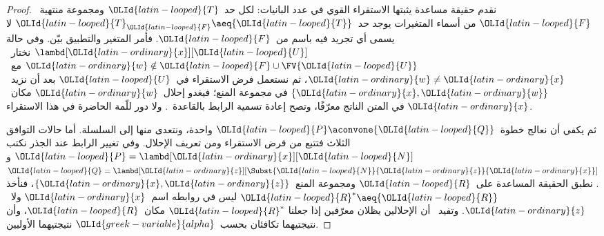 \documentclass[../../../include/open-logic-section]{subfiles}
\begin{document}
\begin{proof}
  نقدم حقيقة مساعدة يثبتها الاستقراء القوي في عدد البانيات: لكل حد~${\OLId{latin-looped}{T}}$
  ومجموعة منتهية~${\OLId{latin-looped}{F}}$ من أسماء المتغيرات يوجد حد~${\OLId{latin-looped}{T}}_{\OLId{latin-looped}{F}}\aeq {\OLId{latin-looped}{T}}$ لا يسمى أي
  تجريد فيه باسم من~${\OLId{latin-looped}{F}}$. فأمر المتغير والتطبيق بيّن. وفي حالة
  $\lambd[{\OLId{latin-ordinary}{x}}][{\OLId{latin-looped}{U}}]$ نختار~${\OLId{latin-ordinary}{w}}\notin {\OLId{latin-looped}{F}}\cup\FV{{\OLId{latin-looped}{U}}}$ مع~${\OLId{latin-ordinary}{w}}\ne {\OLId{latin-ordinary}{x}}$، ثم نستعمل
  فرض الاستقراء في~${\OLId{latin-looped}{U}}$ بعد أن نزيد~$\{{\OLId{latin-ordinary}{x}},{\OLId{latin-ordinary}{w}}\}$ في مجموعة المنع؛ فيغدو
  إحلال~${\OLId{latin-ordinary}{w}}$ مكان~${\OLId{latin-ordinary}{x}}$ في المتن الناتج معرّفًا، وتصح إعادة تسمية الرابط
  بالقاعدة~. ولا دور للّمة الحاضرة في هذا
  الاستقراء.

  ثم يكفي أن نعالج خطوة~${\OLId{latin-looped}{P}}\aconvone {\OLId{latin-looped}{Q}}$ واحدة، ونتعدى منها إلى السلسلة.
  أما حالات التوافق الثلاث فتتبع من فرض الاستقراء ومن تعريف الإحلال.
  وفي تغيير الرابط عند الجذر نكتب
  ${\OLId{latin-looped}{P}}=\lambd[{\OLId{latin-ordinary}{x}}][{\OLId{latin-looped}{N}}]$ و${\OLId{latin-looped}{Q}}=\lambd[{\OLId{latin-ordinary}{z}}][\Subst{{\OLId{latin-looped}{N}}}{{\OLId{latin-ordinary}{z}}}{{\OLId{latin-ordinary}{x}}}]$.
  نطبق الحقيقة المساعدة على~${\OLId{latin-looped}{R}}$ ومجموعة المنع~$\{{\OLId{latin-ordinary}{x}},{\OLId{latin-ordinary}{z}}\}$، فنأخذ
  ${\OLId{latin-looped}{R}}^\ast\aeq {\OLId{latin-looped}{R}}$ ليس في روابطه اسم~${\OLId{latin-ordinary}{x}}$ ولا~${\OLId{latin-ordinary}{z}}$.
  وتفيد~ أن الإحلالين يظلان معرّفين إذا جعلنا
  ${\OLId{latin-looped}{R}}^\ast$ مكان~${\OLId{latin-looped}{R}}$، وأن نتيجتيهما تكافئان بحسب~${\OLId{greek-variable}{alpha}}$ نتيجتيهما
  الأوليين.


\end{proof}
\end{document}
